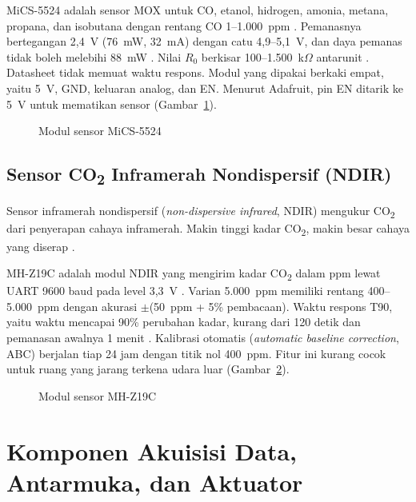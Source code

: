     MiCS-5524 adalah sensor MOX untuk CO, etanol, hidrogen, amonia, metana, propana, dan isobutana dengan rentang CO 1--1.000~ppm \cite{mics5524}. Pemanasnya bertegangan 2,4~V (76~mW, 32~mA) dengan catu 4,9--5,1~V, dan daya pemanas tidak boleh melebihi 88~mW \cite{mics5524}. Nilai $R_0$ berkisar 100--1.500~k$\Omega$ antarunit \cite{mics5524}. Datasheet tidak memuat waktu respons. Modul yang dipakai berkaki empat, yaitu 5~V, GND, keluaran analog, dan EN. Menurut Adafruit, pin EN ditarik ke 5~V untuk mematikan sensor \cite{adafruit_mics} (Gambar~\ref{fig:Ch02_MiCS5524}).

    \begin{figure}[h!]
        \centering
        \caption{Modul sensor MiCS-5524}
        \label{fig:Ch02_MiCS5524}
    \end{figure}

    \subsection{Sensor CO\texorpdfstring{\textsubscript{2}}{2} Inframerah Nondispersif (NDIR)}
    \label{sec:Sensor_NDIR}

    Sensor inframerah nondispersif (\textit{non-dispersive infrared}, NDIR) mengukur CO\textsubscript{2} dari penyerapan cahaya inframerah. Makin tinggi kadar CO\textsubscript{2}, makin besar cahaya yang diserap \cite{mhz19c}.

    MH-Z19C adalah modul NDIR yang mengirim kadar CO\textsubscript{2} dalam ppm lewat UART 9600 baud pada level 3,3~V \cite{mhz19c}. Varian 5.000~ppm memiliki rentang 400--5.000~ppm dengan akurasi $\pm$(50~ppm + 5\% pembacaan). Waktu respons T90, yaitu waktu mencapai 90\% perubahan kadar, kurang dari 120 detik dan pemanasan awalnya 1 menit \cite{mhz19c}. Kalibrasi otomatis (\textit{automatic baseline correction}, ABC) berjalan tiap 24 jam dengan titik nol 400~ppm. Fitur ini kurang cocok untuk ruang yang jarang terkena udara luar \cite{mhz19c} (Gambar~\ref{fig:Ch02_MHZ19C}).

    \begin{figure}[h!]
        \centering
        \caption{Modul sensor MH-Z19C}
        \label{fig:Ch02_MHZ19C}
    \end{figure}


\section{Komponen Akuisisi Data, Antarmuka, dan Aktuator}
\label{sec:antarmuka_aktuator}


